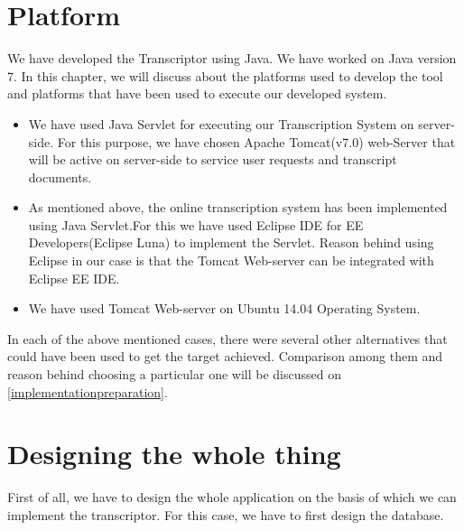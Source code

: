 \documentclass[12pt,oneside,openany,a4paper]{book}
\begin{document}
\chapter{Platform}
\label{platform}
We have developed the Transcriptor using Java. We have worked on Java version 7.  In this chapter, we will discuss about the platforms used to develop the tool and platforms that have been used to execute our developed system.
\begin{itemize}
\item{We have used Java Servlet for executing our Transcription System on server-side. For this purpose, we have chosen Apache Tomcat(v7.0) web-Server that will be active on server-side to service user requests and transcript documents.}
\item{As mentioned above, the online transcription system has been implemented using Java Servlet.For this we have used Eclipse IDE for EE Developers(Eclipse Luna) to implement the Servlet. Reason behind using Eclipse in our case is that the Tomcat Web-server can be integrated with Eclipse EE IDE.
}
\item{We have used Tomcat Web-server on Ubuntu 14.04 Operating System.}
\end{itemize}
In each of the above mentioned cases, there were several other alternatives that could have been used to get the target achieved. Comparison among them and reason behind choosing a particular one will be discussed on  \autoref{implementationpreparation}.

\chapter{Designing the whole thing}
\label{design}
First of all, we have to design the whole application on the basis of which we can implement the transcriptor. For this case, we have to first design the database.
\end{document}
